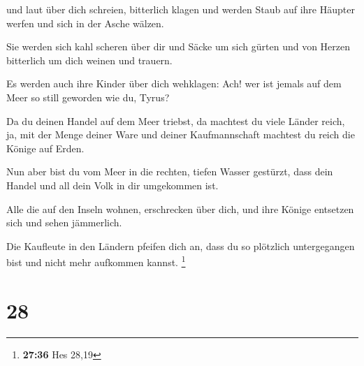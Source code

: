  und laut über dich schreien, bitterlich klagen und werden
Staub auf ihre Häupter werfen und sich in der Asche wälzen.

 Sie werden sich kahl scheren über dir und Säcke um sich
gürten und von Herzen bitterlich um dich weinen und trauern.

 Es werden auch ihre Kinder über dich wehklagen: Ach! wer
ist jemals auf dem Meer so still geworden wie du, Tyrus?

 Da du deinen Handel auf dem Meer triebst, da machtest du
viele Länder reich, ja, mit der Menge deiner Ware und deiner
Kaufmannschaft machtest du reich die Könige auf Erden.

 Nun aber bist du vom Meer in die rechten, tiefen Wasser
gestürzt, dass dein Handel und all dein Volk in dir umgekommen ist.

 Alle die auf den Inseln wohnen, erschrecken über dich, und
ihre Könige entsetzen sich und sehen jämmerlich.

 Die Kaufleute in den Ländern pfeifen dich an, dass du so
plötzlich untergegangen bist und nicht mehr aufkommen kannst.
\footnote{\textbf{27:36} Hes 28,19}

\hypertarget{section-8}{%
\section{28}\label{section-8}}

